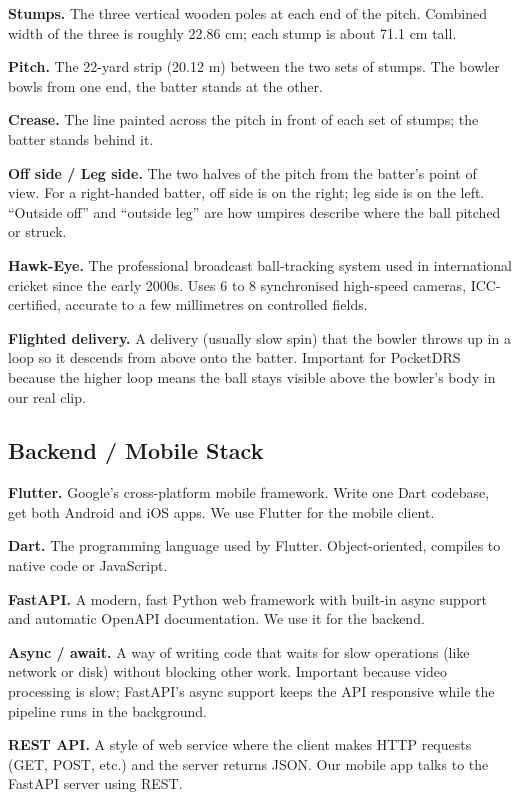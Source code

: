 \documentclass[11pt,a4paper]{article}
\begin{document}
\textbf{Stumps.} The three vertical wooden poles at each end of the pitch. Combined width of the three is roughly 22.86 cm; each stump is about 71.1 cm tall.

\textbf{Pitch.} The 22-yard strip (20.12 m) between the two sets of stumps. The bowler bowls from one end, the batter stands at the other.

\textbf{Crease.} The line painted across the pitch in front of each set of stumps; the batter stands behind it.

\textbf{Off side / Leg side.} The two halves of the pitch from the batter's point of view. For a right-handed batter, off side is on the right; leg side is on the left. ``Outside off'' and ``outside leg'' are how umpires describe where the ball pitched or struck.

\textbf{Hawk-Eye.} The professional broadcast ball-tracking system used in international cricket since the early 2000s. Uses 6 to 8 synchronised high-speed cameras, ICC-certified, accurate to a few millimetres on controlled fields.

\textbf{Flighted delivery.} A delivery (usually slow spin) that the bowler throws up in a loop so it descends from above onto the batter. Important for PocketDRS because the higher loop means the ball stays visible above the bowler's body in our real clip.

\subsection{Backend / Mobile Stack}

\textbf{Flutter.} Google's cross-platform mobile framework. Write one Dart codebase, get both Android and iOS apps. We use Flutter for the mobile client.

\textbf{Dart.} The programming language used by Flutter. Object-oriented, compiles to native code or JavaScript.

\textbf{FastAPI.} A modern, fast Python web framework with built-in async support and automatic OpenAPI documentation. We use it for the backend.

\textbf{Async / await.} A way of writing code that waits for slow operations (like network or disk) without blocking other work. Important because video processing is slow; FastAPI's async support keeps the API responsive while the pipeline runs in the background.

\textbf{REST API.} A style of web service where the client makes HTTP requests (GET, POST, etc.) and the server returns JSON. Our mobile app talks to the FastAPI server using REST.
\end{document}
